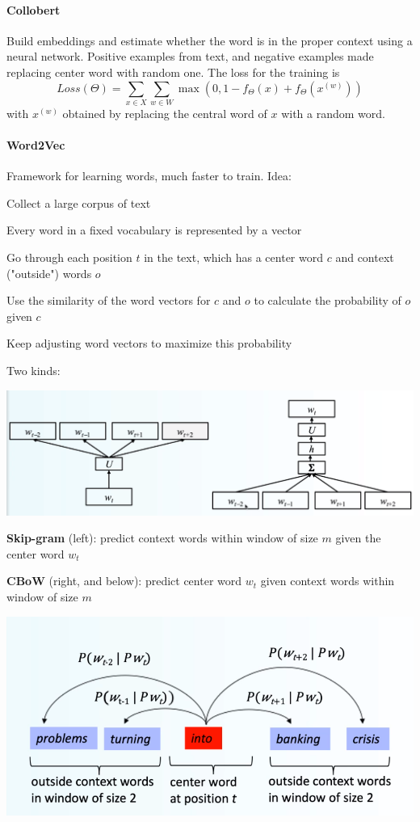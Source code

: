\documentclass[10pt]{report}
\begin{document}
\paragraph{Collobert} Build embeddings and estimate whether the word is in the proper context using a neural network. Positive examples from text, and negative examples made replacing center word with random one. The loss for the training is $$Loss(\Theta) = \sum_{x\in X}\sum_{w\in W} \max(0, 1-f_\Theta(x) + f_\Theta(x^{(w)}))$$
with $x^{(w)}$ obtained by replacing the central word of $x$ with a random word.
\paragraph{Word2Vec} Framework for learning words, much faster to train. Idea:\begin{list}{}{}
	\item Collect a large corpus of text
	\item Every word in a fixed vocabulary is represented by a vector
	\item Go through each position $t$ in the text, which has a center word $c$ and context ("outside") words $o$
	\item Use the similarity of the word vectors for $c$ and $o$ to calculate the probability of $o$ given $c$
	\item Keep adjusting word vectors to maximize this probability
\end{list}
Two kinds:
\begin{center}
	\includegraphics[scale=0.5]{3.png}
\end{center}
\begin{list}{}{}
	\item \textbf{Skip-gram} (left): predict context words within window of size $m$ given the center word $w_t$
	\item \textbf{CBoW} (right, and below): predict center word $w_t$ given context words within window of size $m$
\end{list}
\begin{center}
	\includegraphics[scale=0.4]{4.png}
\end{center}
\end{document}
